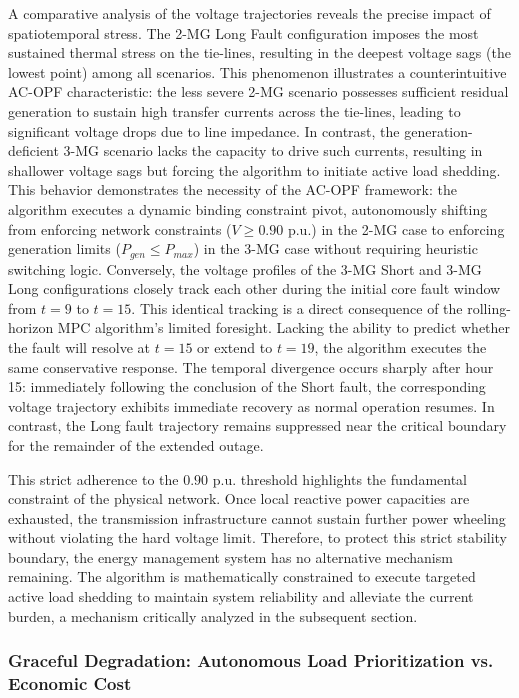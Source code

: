 A comparative analysis of the voltage trajectories reveals the precise impact of spatiotemporal stress. The 2-MG Long Fault configuration imposes the most sustained thermal stress on the tie-lines, resulting in the deepest voltage sags (the lowest point) among all scenarios. This phenomenon illustrates a counterintuitive AC-OPF characteristic: the less severe 2-MG scenario possesses sufficient residual generation to sustain high transfer currents across the tie-lines, leading to significant voltage drops due to line impedance. In contrast, the generation-deficient 3-MG scenario lacks the capacity to drive such currents, resulting in shallower voltage sags but forcing the algorithm to initiate active load shedding. This behavior demonstrates the necessity of the AC-OPF framework: the algorithm executes a dynamic binding constraint pivot, autonomously shifting from enforcing network constraints ($V \ge 0.90$ p.u.) in the 2-MG case to enforcing generation limits ($P_{gen} \le P_{max}$) in the 3-MG case without requiring heuristic switching logic. Conversely, the voltage profiles of the 3-MG Short and 3-MG Long configurations closely track each other during the initial core fault window from $t=9$ to $t=15$. This identical tracking is a direct consequence of the rolling-horizon MPC algorithm's limited foresight. Lacking the ability to predict whether the fault will resolve at $t=15$ or extend to $t=19$, the algorithm executes the same conservative response. The temporal divergence occurs sharply after hour 15: immediately following the conclusion of the Short fault, the corresponding voltage trajectory exhibits immediate recovery as normal operation resumes. In contrast, the Long fault trajectory remains suppressed near the critical boundary for the remainder of the extended outage.

This strict adherence to the $0.90$ p.u. threshold highlights the fundamental constraint of the physical network. Once local reactive power capacities are exhausted, the transmission infrastructure cannot sustain further power wheeling without violating the hard voltage limit. Therefore, to protect this strict stability boundary, the energy management system has no alternative mechanism remaining. The algorithm is mathematically constrained to execute targeted active load shedding to maintain system reliability and alleviate the current burden, a mechanism critically analyzed in the subsequent section.

\subsubsection{Graceful Degradation: Autonomous Load Prioritization vs. Economic Cost}

